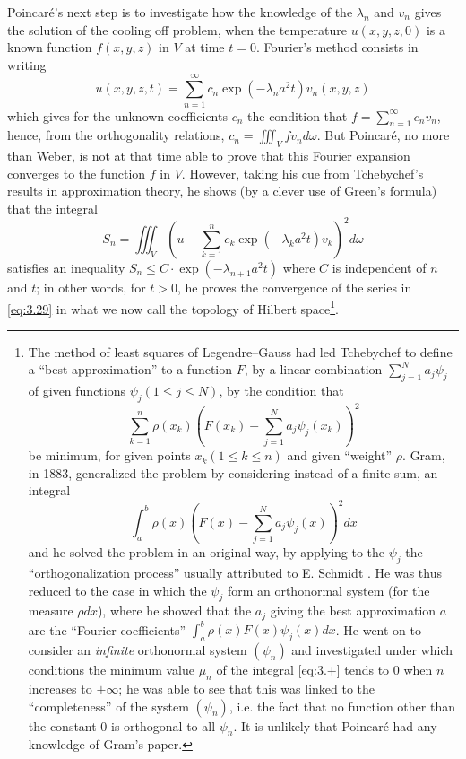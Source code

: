 \documentclass[12pt,a4paper,leqno,twoside]{extbook}
\begin{document}
Poincaré's next step is to investigate how the knowledge of the \(\lambda_n\) and \(v_n\) gives the solution of the cooling off problem, when the temperature \(u(x,y,z,0)\) is a known function \(f(x,y,z)\) in \(V\) at time \(t = 0\). Fourier's method consists in writing
\begin{equation}
    \label{eq:3.29}
    u(x,y,z,t) = \sum_{n=1}^\infty c_n \exp\left( -\lambda_n a^2 t \right) v_n(x,y,z)
\end{equation}
which gives for the unknown coefficients \(c_n\) the condition that \(f = \sum\limits_{n=1}^\infty c_n v_n\), hence, from the orthogonality relations, \(c_n = \iiint_V fv_n d\omega\). But Poincaré, no more than Weber, is not at that time able to prove that this Fourier expansion converges to the function \(f\) in \(V\). However, taking his cue from Tchebychef's results in approximation theory, he shows (by a clever use of Green's formula) that the integral
\[
    S_n = \iiint_V \left( u - \sum_{k=1}^n c_k \exp\left( -\lambda_k a^2 t \right) v_k \right)^2 d\omega
\]
satisfies an inequality \(S_n \leq C \cdot \exp\left(-\lambda_{n+1} a^2 t\right)\) where \(C\) is independent of \(n\) and \(t\); in other words, for \(t > 0\), he proves the convergence of the series in \eqref{eq:3.29} in what we now call the topology of Hilbert space\footnote{The method of least squares of Legendre--Gauss had led Tchebychef to define a ``best approximation'' to a function \(F\), by a linear combination \(\sum\limits_{j=1}^N a_j \psi_j\) of given functions \(\psi_j (1 \leq j \leq N)\), by the condition that
\[
    \sum_{k=1}^n \rho(x_k)\left( F(x_k) - \sum_{j=1}^N a_j \psi_j(x_k) \right)^2
\]
be minimum, for given points \(x_k (1 \leq k \leq n)\) and given ``weight'' \(\rho\). Gram, in 1883, generalized the problem by considering instead of a finite sum, an integral
\begin{equation}
    \tag{+}
    \label{eq:3.+}
    \int_a^b \rho(x) \left( F(x) - \sum_{j=1}^N a_j \psi_j(x) \right)^2 dx
\end{equation}
and he solved the problem in an original way, by applying to the \(\psi_j\) the ``orthogonalization process'' usually attributed to E. Schmidt \cite{089}. He was thus reduced to the case in which the \(\psi_j\) form an orthonormal system (for the measure \(\rho dx\)), where he showed that the \(a_j\) giving the best approximation \(a\) are the ``Fourier coefficients'' \(\int_a^b \rho(x)F(x)\psi_j(x)dx\). He went on to consider an \emph{infinite} orthonormal system \((\psi_n)\) and investigated under which conditions the minimum value \(\mu_n\) of the integral \eqref{eq:3.+} tends to 0 when \(n\) increases to \(+\infty\); he was able to see that this was linked to the ``completeness'' of the system \((\psi_n)\), i.e. the fact that no function other than the constant 0 is orthogonal to all \(\psi_n\). It is unlikely that Poincaré had any knowledge of Gram's paper.}.
\end{document}
